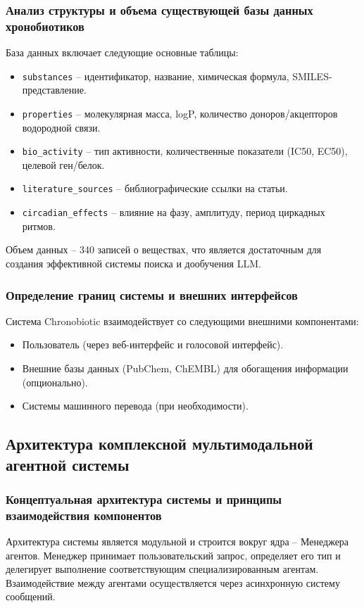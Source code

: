 \documentclass[a4paper,14pt]{extarticle}
\begin{document}
	\subsubsection{Анализ структуры и объема существующей базы данных хронобиотиков}
	База данных включает следующие основные таблицы:
	\begin{itemize}
		\item \texttt{substances} – идентификатор, название, химическая формула, SMILES-представление.
		\item \texttt{properties} – молекулярная масса, logP, количество доноров/акцепторов водородной связи.
		\item \texttt{bio\_activity} – тип активности, количественные показатели (IC50, EC50), целевой ген/белок.
		\item \texttt{literature\_sources} – библиографические ссылки на статьи.
		\item \texttt{circadian\_effects} – влияние на фазу, амплитуду, период циркадных ритмов.
	\end{itemize}
	Объем данных – 340 записей о веществах, что является достаточным для создания эффективной системы поиска и дообучения LLM.
	
	\subsubsection{Определение границ системы и внешних интерфейсов}
	Система Chronobiotic взаимодействует со следующими внешними компонентами:
	\begin{itemize}
		\item Пользователь (через веб-интерфейс и голосовой интерфейс).
		\item Внешние базы данных (PubChem, ChEMBL) для обогащения информации (опционально).
		\item Системы машинного перевода (при необходимости).
	\end{itemize}
	
	\subsection{Архитектура комплексной мультимодальной агентной системы}
	
	\subsubsection{Концептуальная архитектура системы и принципы взаимодействия компонентов}
	Архитектура системы является модульной и строится вокруг ядра – Менеджера агентов. Менеджер принимает пользовательский запрос, определяет его тип и делегирует выполнение соответствующим специализированным агентам. Взаимодействие между агентами осуществляется через асинхронную систему сообщений.
	
\end{document}
